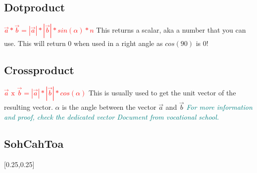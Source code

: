 \documentclass[main.tex,fontsize=8pt,paper=a4,paper=portrait,DIV=calc,]{scrartcl}
\begin{document}
\begin{multicols*}{2}
\subsection{Dotproduct}
\Large{\textbf{\textcolor{red}{\( \vec{a} * \vec{b} = |\vec{a}| * |\vec{b}| * sin(\alpha) * n \)}}}\newline
\normalsize This returns a scalar, aka a number that you can use.\newline
This will return 0 when used in a right angle as \(cos(90)\) is 0!\\
\subsection{Crossproduct}
\Large{\textbf{\textcolor{red}{\( \vec{a} \text{ x } \vec{b} = |\vec{a}| * |\vec{b}| * cos(\alpha) \)}}}\newline
\normalsize This is usually used to get the unit vector of the resulting vector.\newline
\(\alpha\) is the angle between the vector \(\vec{a}\) and \(\vec{b}\)\newline
\emph{\textcolor{teal}{For more information and proof, check the dedicated vector Document from vocational school.}}\\

\subsection{SohCahToa}
[0.25,0.25]


\end{multicols*}
\end{document}
